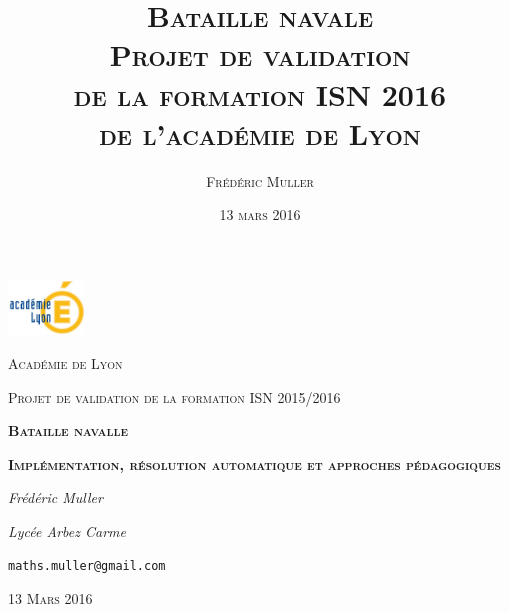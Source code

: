 \title{\Huge{\textsc{Bataille navale}}\\ \medskip \medskip\medskip\medskip \large{\textsc{Projet de validation\\de la formation ISN 2016\\de l'académie de Lyon}}}


\author{\textsc{Frédéric Muller}}
\date{\vfill \textsc{13 mars 2016}} 

\pagestyle{empty}

\begin{titlepage}
	\centering
	\includegraphics[width=0.15\textwidth]{./media/academie.jpg}\par\vspace{1cm}
	{\scshape\LARGE Académie de Lyon \par}
	\vspace{1cm}
	{\scshape\Large Projet de validation de la formation ISN 2015/2016\par}
	\vspace{2cm}
	{\Huge\bfseries\scshape Bataille navalle\par}
	{\Large\bfseries\scshape Implémentation, résolution automatique et approches pédagogiques\par}
	\vspace{2cm}
	{\Large\itshape Frédéric Muller\par}{\large\itshape Lycée Arbez Carme\par}
	\medskip	
	{\large\texttt{maths.muller@gmail.com}\par}


	\vfill

	{\scshape\large 13 Mars 2016\par}
\end{titlepage}



\newpage
\ \\
\vfill


